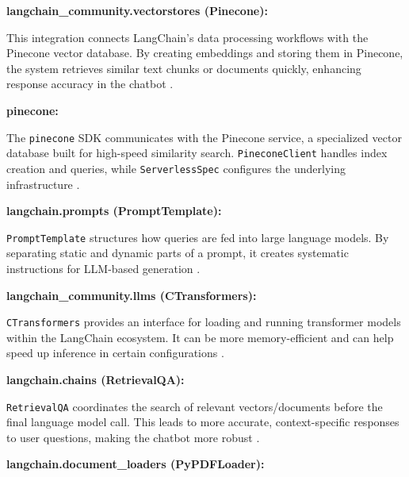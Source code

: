 \vspace{0.4cm}
\noindent\textbf{langchain\_community.vectorstores (Pinecone):}

\noindent
This integration connects LangChain’s data processing workflows with the Pinecone vector database. By creating embeddings 
and storing them in Pinecone, the system retrieves similar text chunks or documents quickly, enhancing response accuracy 
in the chatbot \cite{langchain}.

\vspace{0.4cm}
\noindent\textbf{pinecone:}

\noindent
The \texttt{pinecone} SDK communicates with the Pinecone service, a specialized vector database built for high-speed 
similarity search. \texttt{PineconeClient} handles index creation and queries, while \texttt{ServerlessSpec} configures 
the underlying infrastructure \cite{pinecone}.

\vspace{0.4cm}
\noindent\textbf{langchain.prompts (PromptTemplate):}

\noindent
\texttt{PromptTemplate} structures how queries are fed into large language models. By separating static and dynamic 
parts of a prompt, it creates systematic instructions for LLM-based generation \cite{langchain}.

\vspace{0.4cm}
\noindent\textbf{langchain\_community.llms (CTransformers):}

\noindent
\texttt{CTransformers} provides an interface for loading and running transformer models within the LangChain ecosystem. 
It can be more memory-efficient and can help speed up inference in certain configurations \cite{sentence_transformers}.

\vspace{0.4cm}
\noindent\textbf{langchain.chains (RetrievalQA):}

\noindent
\texttt{RetrievalQA} coordinates the search of relevant vectors/documents before the final language model call. 
This leads to more accurate, context-specific responses to user questions, making the chatbot more robust \cite{langchain}.

\vspace{0.4cm}
\noindent\textbf{langchain.document\_loaders (PyPDFLoader):}

